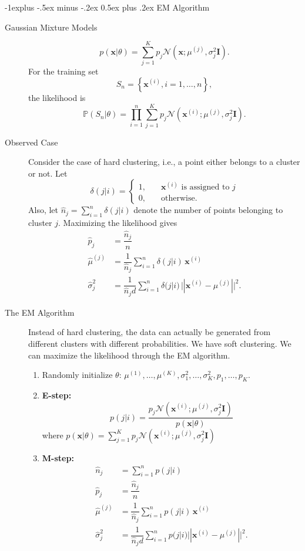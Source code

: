 \documentclass[a4paper, 10pt,landscape]{article}
\makeatletter
\renewcommand{\subsection}{\@startsection{subsection}{2}{0mm}%
                                {-1explus -.5ex minus -.2ex}%
                                {0.5ex plus .2ex}%
                                {\normalfont\normalsize\bfseries}}
\makeatother
\begin{document}
\begin{multicols*}{3}
\subsection{EM Algorithm}
\begin{description}
	\item[Gaussian Mixture Models] 
	$$p(\mathbf{x}|\theta)=\sum_{j=1}^{K}p_j\mathcal{N}\left(\mathbf{x};\mu^{(j)},\sigma_j^2\mathbf{I}\right).$$
	For the training set
	$$S_n=\left\{\mathbf{x}^{(i)}, i=1,\dots,n\right\},$$
	the likelihood is
	$$\mathbb{P}\left(S_n|\theta\right)=\prod_{i=1}^{n}\sum_{j=1}^{K}p_j\mathcal{N}\left(\mathbf{x}^{(i)};\mu^{(j)},\sigma_j^2\mathbf{I}\right).$$
	\item[Observed Case] Consider the case of hard clustering, i.e., a point either belongs to a cluster or not. Let
	$$\delta(j|i)=
	\begin{cases}
		1,\quad&\mathbf{x}^{(i)}\text{ is assigned to }j\\
		0,&\text{otherwise}.
	\end{cases}$$
	Also, let $\widehat{n}_j=\sum\limits_{i=1}^{n}\delta(j|i)$ denote the number of points belonging to cluster $j$. Maximizing the likelihood gives
	\begin{align*}
		\widehat{p}_j&=\dfrac{\widehat{n}_j}{n}\\
		\widehat{\mu}^{(j)}&=\dfrac{1}{\widehat{n}_j}\sum_{i=1}^{n}\delta(j|i)\,\mathbf{x}^{(i)}\\
		\widehat{\sigma}^2_j&=\dfrac{1}{\widehat{n}_jd}\sum_{i=1}^{n}\delta(j|i)\,||\mathbf{x}^{(i)}-\mu^{(j)}||^2.
	\end{align*}
	\item[The EM Algorithm] Instead of hard clustering, the data can actually be generated from different clusters with different probabilities. We have soft clustering. We can maximize the likelihood through the EM algorithm.
	\begin{enumerate}
		\item[] Randomly initialize $\theta$: $\mu^{(1)},\dots,\mu^{(K)},\sigma^2_1,\dots,\sigma^2_K,p_1,\dots,p_K.$
		\item {\bf E-step:}
		$$p(j|i)=\dfrac{p_j\mathcal{N}\left(\mathbf{x}^{(i)};\mu^{(j)},\sigma^2_j\mathbf{I}\right)}{p\left(\mathbf{x}|\theta\right)}$$
		where $p(\mathbf{x}|\theta)=\sum\limits_{j=1}^{K}p_j\mathcal{N}\left(\mathbf{x}^{(i)};\mu^{(j)},\sigma^2_j\mathbf{I}\right)$
		\item {\bf M-step:}
		\begin{align*}
			\widehat{n}_j&=\sum_{i=1}^{n}p(j|i)\\
			\widehat{p}_j&=\dfrac{\widehat{n}_j}{n}\\
			\widehat{\mu}^{(j)}&=\dfrac{1}{\widehat{n}_j}\sum_{i=1}^{n}p(j|i)\,\mathbf{x}^{(i)}\\
			\widehat{\sigma}^2_j&=\dfrac{1}{\widehat{n}_jd}\sum_{i=1}^{n}p(j|i)||\mathbf{x}^{(i)}-\mu^{(j)}||^2.
		\end{align*}
	\end{enumerate}
\end{description}




\end{multicols*}
\end{document}
